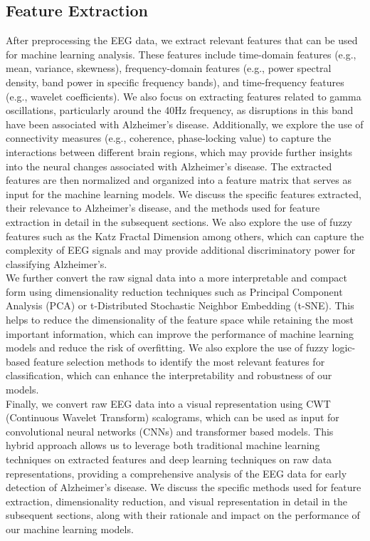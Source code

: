 \documentclass[openany]{book}
\begin{document}
\subsection{Feature Extraction}
After preprocessing the EEG data, we extract relevant features that can be used for machine learning analysis. These features include time-domain features (e.g., mean, variance, skewness), frequency-domain features (e.g., power spectral density, band power in specific frequency bands), and time-frequency features (e.g., wavelet coefficients). We also focus on extracting features related to gamma oscillations, particularly around the 40Hz frequency, as disruptions in this band have been associated with Alzheimer's disease. Additionally, we explore the use of connectivity measures (e.g., coherence, phase-locking value) to capture the interactions between different brain regions, which may provide further insights into the neural changes associated with Alzheimer's disease. The extracted features are then normalized and organized into a feature matrix that serves as input for the machine learning models. We discuss the specific features extracted, their relevance to Alzheimer's disease, and the methods used for feature extraction in detail in the subsequent sections. We also explore the use of fuzzy features such as the Katz Fractal Dimension among others, which can capture the complexity of EEG signals and may provide additional discriminatory power for classifying Alzheimer's. \\
We further convert the raw signal data into a more interpretable and compact form using dimensionality reduction techniques such as Principal Component Analysis (PCA) or t-Distributed Stochastic Neighbor Embedding (t-SNE). This helps to reduce the dimensionality of the feature space while retaining the most important information, which can improve the performance of machine learning models and reduce the risk of overfitting. We also explore the use of fuzzy logic-based feature selection methods to identify the most relevant features for classification, which can enhance the interpretability and robustness of our models. \\
Finally, we convert raw EEG data into a visual representation using CWT (Continuous Wavelet Transform) scalograms, which can be used as input for convolutional neural networks (CNNs) and transformer based models. This hybrid approach allows us to leverage both traditional machine learning techniques on extracted features and deep learning techniques on raw data representations, providing a comprehensive analysis of the EEG data for early detection of Alzheimer's disease. We discuss the specific methods used for feature extraction, dimensionality reduction, and visual representation in detail in the subsequent sections, along with their rationale and impact on the performance of our machine learning models. \\
\end{document}

